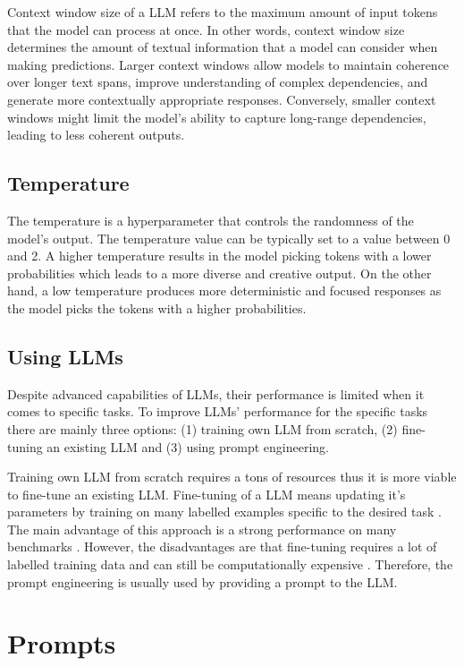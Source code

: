 Context window size of a LLM refers to the maximum amount of input tokens that the model can process at once. In other words, context window size determines the amount of textual information that a model can consider when making predictions. Larger context windows allow models to maintain coherence over longer text spans, improve understanding of complex dependencies, and generate more contextually appropriate responses. Conversely, smaller context windows might limit the model's ability to capture long-range dependencies, leading to less coherent outputs.


\subsection{Temperature}
\label{temperature}
The temperature is a hyperparameter that controls the randomness of the model's output. The temperature value can be typically set to a value between 0 and 2. A higher temperature results in the model picking tokens with a lower probabilities which leads to a more diverse and creative output. On the other hand, a low temperature produces more deterministic and focused responses as the model picks the tokens with a higher probabilities.


\subsection{Using LLMs}

Despite advanced capabilities of LLMs, their performance is limited when it comes to specific tasks. To improve LLMs' performance for the specific tasks there are mainly three options: (1) training own LLM from scratch, (2) fine-tuning an existing LLM and (3) using prompt engineering.

Training own LLM from scratch requires a tons of resources \cite{Zhao2023} thus it is more viable to fine-tune an existing LLM. Fine-tuning of a LLM means updating it's parameters by training on many labelled examples specific to the desired task \cite{Brown2020}. The main advantage of this approach is a strong performance on many benchmarks \cite{Brown2020}. However, the disadvantages are that fine-tuning requires a lot of labelled training data and can still be computationally expensive \cite{Brown2020}. Therefore, the prompt engineering is usually used by providing a prompt to the LLM.


\section{Prompts}

